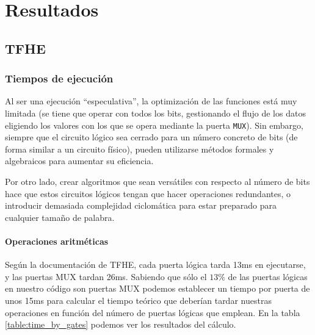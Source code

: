 \chapter{Resultados}
\label{chap:resultados}


\section{TFHE}

\subsection{Tiempos de ejecución}

Al ser una ejecución ``especulativa'', la optimización de las funciones está muy limitada (se tiene que operar con todos los bits, gestionando el flujo de los datos eligiendo los valores con los que se opera mediante la puerta \verb|MUX|). Sin embargo, siempre que el circuito lógico sea cerrado para un número concreto de bits (de forma similar a un circuito físico), pueden utilizarse métodos formales y algebraicos para aumentar su eficiencia.

Por otro lado, crear algoritmos que sean versátiles con respecto al número de bits hace que estos circuitos lógicos tengan que hacer operaciones redundantes, o introducir demasiada complejidad ciclomática para estar preparado para cualquier tamaño de palabra.

\subsubsection{Operaciones aritméticas}

Según la documentación de TFHE, cada puerta lógica tarda 13ms en ejecutarse, y las puertas MUX tardan 26ms. Sabiendo que sólo el $ 13\% $ de las puertas lógicas en nuestro código son puertas MUX podemos establecer un tiempo por puerta de unos 15ms para calcular el tiempo teórico que deberían tardar nuestras operaciones en función del número de puertas lógicas que emplean. En la tabla \ref{table:time_by_gates} podemos ver los resultados del cálculo.

